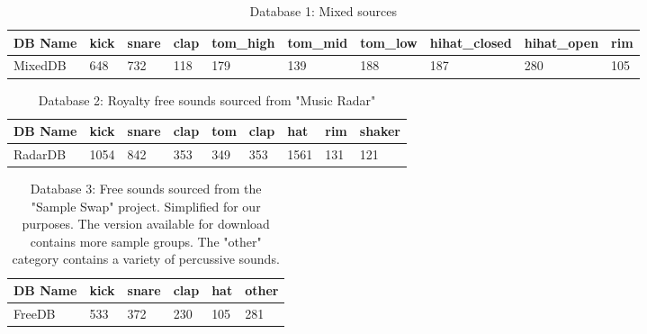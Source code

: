 \documentclass[\main/thesis.tex]{subfiles}
\begin{document}


\begin{table}[p]
\centering
\hspace*{-2cm}\begin{tabular}[width=0.95\paperwidth]{|l|l|l|l|l|l|l|l|l|l|}
\hline
DB Name & kick & snare & clap & tom\_high & tom\_mid & tom\_low & hihat\_closed &  hihat\_open & rim \\ \hline
MixedDB & 648 & 732 & 118 & 179 & 139 &  188 & 187 & 280 & 105 \\\hline
\end{tabular}
\caption{Database 1: Mixed sources}
\label{db:self}
\end{table}

\begin{table}[h!]
\centering
\begin{tabular}{|l|l|l|l|l|l|l|l|l|}
\hline
DB Name & kick & snare & clap & tom & clap & hat & rim & shaker  \\ \hline
RadarDB & 1054 & 842   & 353 & 349 &  353 & 1561& 131 & 121 \\ \hline
\end{tabular}
\caption{Database 2: Royalty free sounds sourced from "Music Radar"}
\label{db:radar}
\end{table}

\begin{table}[h!]
\centering
\begin{tabular}{|l|l|l|l|l|l|}
\hline
 DB Name & kick & snare & clap & hat & other \\\hline
 FreeDB & 533 & 372 & 230 & 105 & 281 \\ \hline
\end{tabular}
\caption{Database 3: Free sounds sourced from the "Sample Swap" project. Simplified for our purposes. The version available for download contains more sample groups. The "other" category contains a variety of percussive sounds.}
\label{db:sampleswap}
\end{table}
\end{document}
